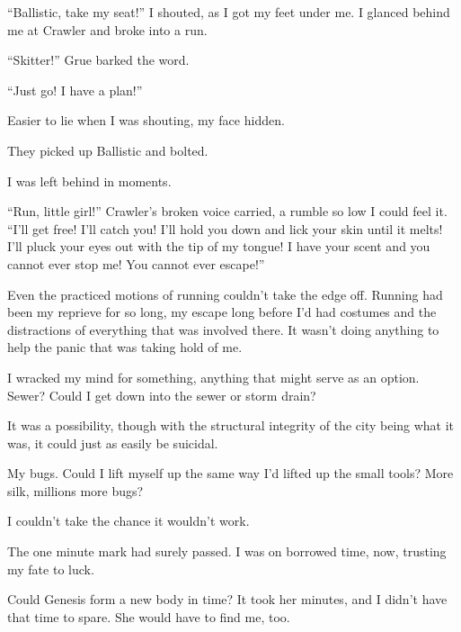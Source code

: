 ``Ballistic, take my seat!''  I shouted, as I got my feet under me.  I glanced behind me at Crawler and broke into a run.



``Skitter!''  Grue barked the word.



``Just go!  I have a plan!''



Easier to lie when I was shouting, my face hidden.



They picked up Ballistic and bolted.



I was left behind in moments.



``Run, little girl!''  Crawler's broken voice carried, a rumble so low I could feel it.  ``I'll get free!  I'll catch you!  I'll hold you down and lick your skin until it melts!  I'll pluck your eyes out with the tip of my tongue!  I have your scent and you cannot ever stop me!  You cannot ever escape!''



Even the practiced motions of running couldn't take the edge off.  Running had been my reprieve for so long, my escape long before I'd had costumes and the distractions of everything that was involved there.  It wasn't doing anything to help the panic that was taking hold of me.



I wracked my mind for something, anything that might serve as an option.  Sewer?  Could I get down into the sewer or storm drain?



It was a possibility, though with the structural integrity of the city being what it was, it could just as easily be suicidal.



My bugs.  Could I lift myself up the same way I'd lifted up the small tools?  More silk, millions more bugs?



I couldn't take the chance it wouldn't work.



The one minute mark had surely passed.  I was on borrowed time, now, trusting my fate to luck.



Could Genesis form a new body in time?  It took her minutes, and I didn't have that time to spare.  She would have to find me, too.



